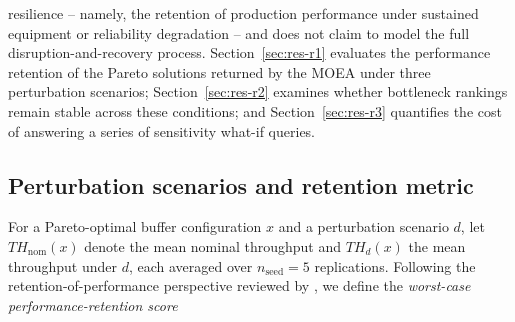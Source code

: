 \documentclass[a4paper,fleqn]{cas-sc}
\begin{document}
  resilience -- namely, the retention of production performance under                                                                       
  sustained equipment or reliability degradation -- and does not claim to                                                                   
  model the full disruption-and-recovery process.                                                                                           
  Section~\ref{sec:res-r1} evaluates the performance retention of the                                                                       
  Pareto solutions returned by the MOEA under three perturbation                                                                            
  scenarios; Section~\ref{sec:res-r2} examines whether bottleneck                                                                           
  rankings remain stable across these conditions; and                                                                                       
  Section~\ref{sec:res-r3} quantifies the cost of answering a series of                                                                     
  sensitivity what-if queries.                                                                                                              
                                                                                                                                            
  \subsection{Perturbation scenarios and retention metric}\label{sec:res-scenarios}                                                         
                                                                                                                                            
  For a Pareto-optimal buffer configuration $x$ and a perturbation                                                                          
  scenario $d$, let $TH_\mathrm{nom}(x)$ denote the mean nominal
  throughput and $TH_d(x)$ the mean throughput under $d$, each averaged                                                                     
  over $n_\mathrm{seed}=5$ replications. Following the                                                                                      
  retention-of-performance perspective reviewed by                                                                                          
  \citet{Hosseini2016}, we define the \emph{worst-case                                                                                      
  performance-retention score}                                                                                                              
                                                                                                                                            
\end{document}
